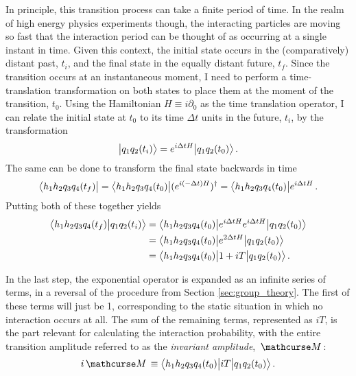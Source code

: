    In principle, this transition process can take a finite period of time.
    In the realm of high energy physics experiments though,
        the interacting particles are moving so fast that the interaction period can be thought of as occurring at a single instant in time.
    Given this context, the initial state occurs in the (comparatively) distant past, $t_i$, and the final state in the equally distant future, $t_f$.
    Since the transition occurs at an instantaneous moment,
        I need to perform a time-translation transformation on both states to place them at the moment of the transition, $t_0$.
    Using the Hamiltonian $H \equiv i\partial_0$ as the time translation operator,
        I can relate the initial state at $t_0$ to its time $\Delta t$ units in the future, $t_i$, by the transformation
    \begin{equation}
        \big| q_{1} q_{2} (t_i) \big> = e^{i\Delta tH}\big| q_{1} q_{2} (t_0) \big>
        \,.
    \end{equation}
    The same can be done to transform the final state backwards in time
    \begin{equation}
        \big< h_1 h_2 q_{3} q_{4} (t_f) \big|
        = \big< h_1 h_2 q_{3} q_{4} (t_0) \big| (e^{i(-\Delta t)H})^\dag
        = \big< h_1 h_2 q_{3} q_{4} (t_0) \big| e^{i\Delta tH}
        \,.
    \end{equation}
    Putting both of these together yields
    \begin{equation} \begin{split} \label{eq:transition_amplitude}
        \big<  h_1 h_2 q_{3} q_{4} (t_f) \big| q_{1} q_{2} (t_i) \big>
        &= \big<  h_1 h_2 q_{3} q_{4} (t_0) \big| e^{i\Delta tH} e^{i\Delta tH} \big| q_{1} q_{2} (t_0) \big>
        \\&= \big<  h_1 h_2 q_{3} q_{4} (t_0) \big| e^{2\Delta tH} \big| q_{1} q_{2} (t_0) \big>
        \\&= \big<  h_1 h_2 q_{3} q_{4} (t_0) \big| 1 + iT \big| q_{1} q_{2} (t_0) \big>
        \,.
    \end{split} \end{equation}

    In the last step, the exponential operator is expanded as an infinite series of terms,
        in a reversal of the procedure from Section \ref{sec:group_theory}.
    The first of these terms will just be 1, corresponding to the static situation in which no interaction occurs at all.
    The sum of the remaining terms, represented as $iT$, is the part relevant for calculating the interaction probability,
        with the entire transition amplitude referred to as the \textit{invariant amplitude}, $\invAmp$:
    \begin{equation}
        i\invAmp \equiv \TbraketA{ h_1 h_2 q_{3} q_{4} (t_0)}{iT}{q_{1} q_{2} (t_0)}
        \,.
    \end{equation}

